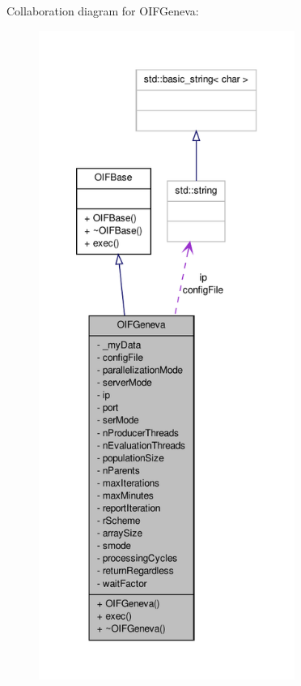 Collaboration diagram for OIFGeneva:
\nopagebreak
\begin{figure}[H]
\begin{center}
\leavevmode
\includegraphics[height=600pt]{df/d29/classOIFGeneva__coll__graph}
\end{center}
\end{figure}
